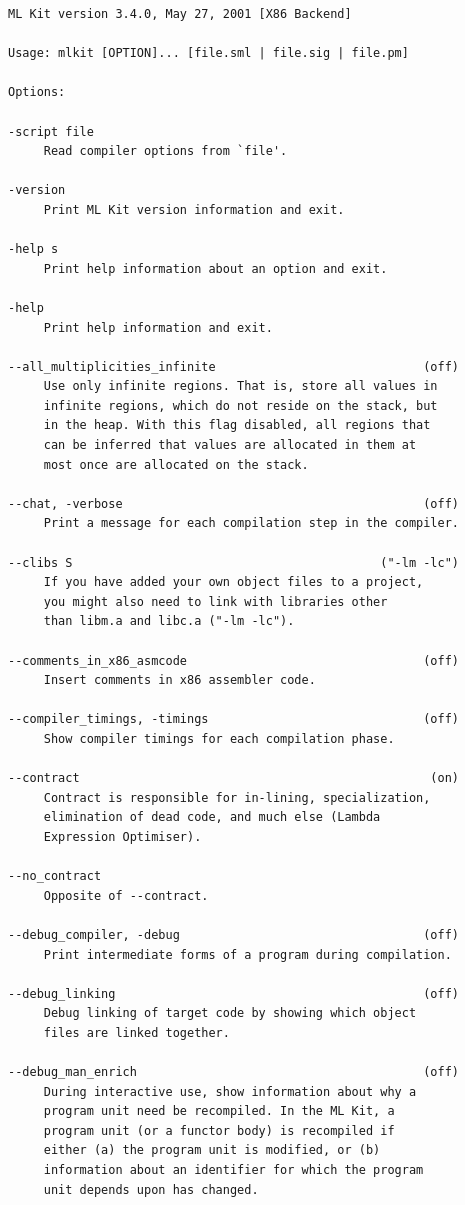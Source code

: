 \documentclass[12pt]{book}
\begin{document}
\begin{verbatim}
ML Kit version 3.4.0, May 27, 2001 [X86 Backend]

Usage: mlkit [OPTION]... [file.sml | file.sig | file.pm]

Options:

-script file
     Read compiler options from `file'.

-version
     Print ML Kit version information and exit.

-help s
     Print help information about an option and exit.

-help
     Print help information and exit.

--all_multiplicities_infinite                             (off)
     Use only infinite regions. That is, store all values in
     infinite regions, which do not reside on the stack, but
     in the heap. With this flag disabled, all regions that
     can be inferred that values are allocated in them at
     most once are allocated on the stack.

--chat, -verbose                                          (off)
     Print a message for each compilation step in the compiler.

--clibs S                                           ("-lm -lc")
     If you have added your own object files to a project,
     you might also need to link with libraries other
     than libm.a and libc.a ("-lm -lc").

--comments_in_x86_asmcode                                 (off)
     Insert comments in x86 assembler code.

--compiler_timings, -timings                              (off)
     Show compiler timings for each compilation phase.

--contract                                                 (on)
     Contract is responsible for in-lining, specialization,
     elimination of dead code, and much else (Lambda
     Expression Optimiser).

--no_contract
     Opposite of --contract.

--debug_compiler, -debug                                  (off)
     Print intermediate forms of a program during compilation.

--debug_linking                                           (off)
     Debug linking of target code by showing which object
     files are linked together.

--debug_man_enrich                                        (off)
     During interactive use, show information about why a
     program unit need be recompiled. In the ML Kit, a
     program unit (or a functor body) is recompiled if
     either (a) the program unit is modified, or (b)
     information about an identifier for which the program
     unit depends upon has changed.


\end{verbatim}
\end{document}
